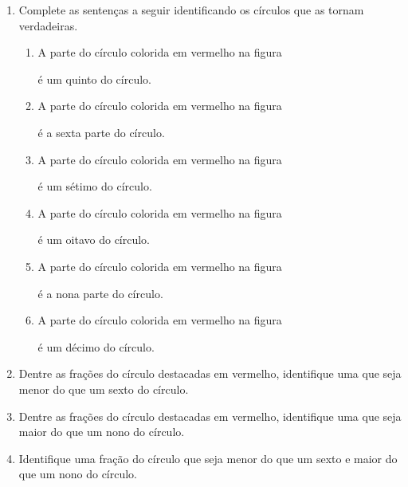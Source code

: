 \documentclass[10 pt,usenames,dvipsnames, oneside]{article}
\begin{document}
\begin{enumerate} %
  \item     Complete as sentenças a seguir identificando os círculos que as tornam verdadeiras.
\begin{enumerate}[label=\Roman*)] %
      \item         A parte do círculo  colorida em vermelho na figura  é um quinto do círculo.
      \item         A parte do círculo colorida em vermelho na figura  é a sexta parte do círculo.
      \item         A parte do círculo colorida em vermelho na figura  é um sétimo do círculo.
      \item         A parte do círculo colorida em vermelho na figura  é um oitavo do círculo.
      \item         A parte do círculo colorida em vermelho na figura  é a nona parte do círculo.
      \item         A parte do círculo colorida em vermelho na figura  é um décimo do círculo.
\end{enumerate} %
  \item     Dentre as frações do círculo destacadas em vermelho, identifique uma que seja menor do que um sexto do círculo.
  \item     Dentre as frações do círculo destacadas em vermelho, identifique uma que seja maior do que um nono do círculo.
  \item     Identifique uma fração do círculo que seja menor do que um sexto e maior do que um nono do círculo.
\end{enumerate} %

\ifdefined\prof
\end{document}
